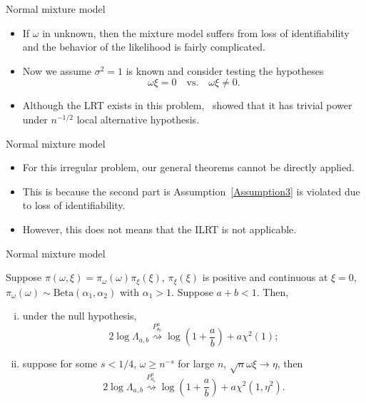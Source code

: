 \documentclass{beamer}
\theoremstyle{plain}
\theoremstyle{definition}
\theoremstyle{remark}
\begin{document}
\begin{frame}{Normal mixture model}
    \begin{itemize}
        \item 
If $\omega$ in unknown, then the mixture model suffers from loss of identifiability and the behavior of the likelihood is fairly complicated.
        \item
Now we assume $\sigma^2=1$ is known and consider testing the hypotheses
\begin{equation*}
    \omega \xi=0
    \quad \text{vs.}\quad
    \omega \xi \neq 0.
    \label{newHy}
\end{equation*}
\item
Although the LRT exists in this problem,~\cite{HALL2005158} showed that it has trivial power under $n^{-1/2}$ local alternative hypothesis. 
    \end{itemize}
\end{frame}
\begin{frame}{Normal mixture model}
    \begin{itemize}
        \item 
For this irregular problem, our general theorems cannot be directly applied.
\item
This is because the second part is Assumption~\eqref{Assumption3} is violated due to loss of identifiability.
\item
However, this does not means that the ILRT is not applicable.
    \end{itemize}
\end{frame}
\begin{frame}{Normal mixture model}
\begin{theorem}
    Suppose $\pi(\omega,\xi)=\pi_{\omega}(\omega) \pi_{\xi}(\xi)$, $\pi_\xi(\xi)$ is positive and continuous at $\xi=0$,
    $\pi_\omega(\omega)\sim \text{Beta}(\alpha_1,\alpha_2)$ with $\alpha_1>1$.
    Suppose $a+b<1$.
    Then,
    \begin{enumerate}[(i)]
        \item
    under the null hypothesis,
    \begin{equation*}
        2\log \Lambda_{a,b} \overset{P^n_{\theta_0}}{\rightsquigarrow}\log(1+\frac a b)+ a\chi^2(1);
    \end{equation*}
\item
    suppose for some $s<1/4$, $\omega \geq n^{-s}$ for large $n$, $\sqrt{n}\omega \xi \to \eta$, then
    \begin{equation*}
        2\log \Lambda_{a,b} \overset{P^n_{\theta_n}}{\rightsquigarrow}\log(1+\frac a b)+ a\chi^2(1,\eta^2).
    \end{equation*}
\end{enumerate}
    \label{mixtureThm}
\end{theorem}
\end{frame}
\end{document}
